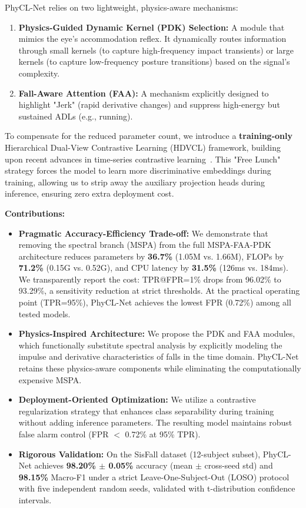 \documentclass{article}
\begin{document}
PhyCL-Net relies on two lightweight, physics-aware mechanisms:

\begin{enumerate}
\item \textbf{Physics-Guided Dynamic Kernel (PDK) Selection:} A module that mimics the eye's accommodation reflex. It dynamically routes information through small kernels (to capture high-frequency impact transients) or large kernels (to capture low-frequency posture transitions) based on the signal's complexity.
\item \textbf{Fall-Aware Attention (FAA):} A mechanism explicitly designed to highlight "Jerk" (rapid derivative changes) and suppress high-energy but sustained ADLs (e.g., running).
\end{enumerate}

To compensate for the reduced parameter count, we introduce a \textbf{training-only} Hierarchical Dual-View Contrastive Learning (HDVCL) framework, building upon recent advances in time-series contrastive learning~\cite{Eldele2021TSTCC,Zhang2022TFC,Zheng2023SimTS}. This "Free Lunch" strategy forces the model to learn more discriminative embeddings during training, allowing us to strip away the auxiliary projection heads during inference, ensuring zero extra deployment cost.

\textbf{Contributions:}
\begin{itemize}
\item \textbf{Pragmatic Accuracy-Efficiency Trade-off:} We demonstrate that removing the spectral branch (MSPA) from the full MSPA-FAA-PDK architecture reduces parameters by \textbf{36.7\%} (1.05M vs. 1.66M), FLOPs by \textbf{71.2\%} (0.15G vs. 0.52G), and CPU latency by \textbf{31.5\%} (126ms vs. 184ms). We transparently report the cost: TPR@FPR=1\% drops from 96.02\% to 93.29\%, a sensitivity reduction at strict thresholds. At the practical operating point (TPR=95\%), PhyCL-Net achieves the lowest FPR (0.72\%) among all tested models.
\item \textbf{Physics-Inspired Architecture:} We propose the PDK and FAA modules, which functionally substitute spectral analysis by explicitly modeling the impulse and derivative characteristics of falls in the time domain. PhyCL-Net retains these physics-aware components while eliminating the computationally expensive MSPA.
\item \textbf{Deployment-Oriented Optimization:} We utilize a contrastive regularization strategy that enhances class separability during training without adding inference parameters. The resulting model maintains robust false alarm control (FPR $<$ 0.72\% at 95\% TPR).
\item \textbf{Rigorous Validation:} On the SisFall dataset (12-subject subset), PhyCL-Net achieves \textbf{98.20\% $\pm$ 0.05\%} accuracy (mean $\pm$ cross-seed std) and \textbf{98.15\%} Macro-F1 under a strict Leave-One-Subject-Out (LOSO) protocol with five independent random seeds, validated with t-distribution confidence intervals.
\end{itemize}
\end{document}
